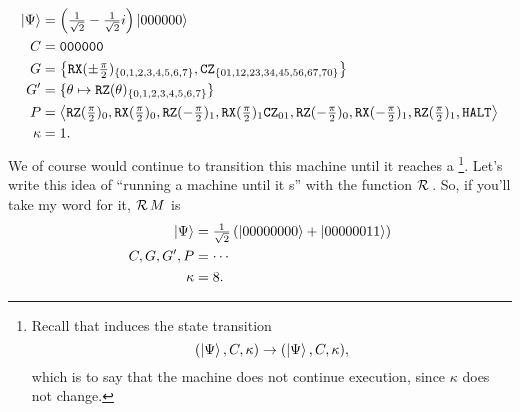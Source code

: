 \begin{align*}
    \ket{\Psi} &= \left(\tfrac{1}{\sqrt{2}}-\tfrac{1}{\sqrt{2}}i\right)\ket{000000}\\
    C          &= \texttt{000000}\\
    G          &= \left\{\mathtt{RX}(\pm\tfrac\pi 2)_{\{0,1,2,3,4,5,6,7\}}, \mathtt{CZ}_{\{01,12,23,34,45,56,67,70\}}\right\}\\
    G'         &= \{\theta\mapsto\mathtt{RZ}(\theta)_{\{0,1,2,3,4,5,6,7\}}\}\\
    P          &= \left\langle
                    \mathtt{RZ}(\tfrac\pi 2)_0,
                    \mathtt{RX}(\tfrac\pi 2)_0,
                    \mathtt{RZ}(-\tfrac\pi 2)_1,
                    \mathtt{RX}(\tfrac\pi 2)_1
                    \mathtt{CZ}_{01},
                    \mathtt{RZ}(-\tfrac \pi 2)_0,
                    \mathtt{RX}(-\tfrac \pi 2)_1,
                    \mathtt{RZ}(\tfrac\pi 2)_1,
                    \mathtt{HALT}{}
                  \right\rangle\\
    \kappa     &= 1.
\end{align*}
We of course would continue to transition this machine until it reaches a \Halt{}\footnote{Recall that \Halt{} induces the state transition
\begin{displaymath}
(\ket{\Psi}, C, \kappa) \to (\ket{\Psi}, C, \kappa),
\end{displaymath}
which is to say that the machine does not continue execution, since $\kappa$ does not change.}. Let's write this idea of ``running a machine until it \Halt{}s'' with the function $\operatorname{\mathcal{R}}{}$. So, if you'll take my word for it, $\operatorname{\mathcal{R}}{M}$ is
\begin{align*}
    \ket{\Psi} &= \tfrac{1}{\sqrt{2}}\left(\ket{00000000}+\ket{00000011}\right)\\
    C,G,G',P   &= \cdots\\
    \kappa     &= 8.
\end{align*}

